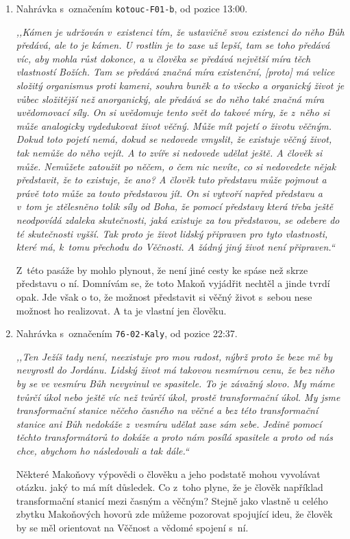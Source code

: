 \begin{enumerate}
{Že ve stavu nebe je člověk v~činnosti zdůrazňuje Makoň opakovaně. Zde mi jde o
výrok, že člověk se má stát spoluspasitelem a spolustvořitelem.

}

\item{
Nahrávka s~označením \texttt{kotouc-F01-b}, od pozice 13:00.

\textit{%
,,Kámen je udržován v~existenci tím, že ustavičně svou existenci do něho Bůh
předává, ale to je kámen. U rostlin je to zase už lepší, tam se toho předává
víc, aby
mohla růst dokonce, a u člověka se předává největší míra těch vlastností Božích.
Tam se předává značná míra existenční, [proto] má velice složitý organismus proti
kameni, souhra buněk a to všecko a organický život je vůbec složitější než
anorganický, ale předává
se do něho také značná míra uvědomovací síly. On si uvědomuje tento svět do
takové míry, že z~něho si může analogicky vydedukovat život věčný. Může mít pojetí
o životu věčným. Dokud toto pojetí nemá, dokud se nedovede vmyslit, že
existuje věčný život, tak nemůže do něho vejít. A to zvíře si nedovede udělat
ještě. A člověk si může. Nemůžete zatoužit po něčem, o čem nic nevíte, co si
nedovedete
nějak představit, že to existuje, že ano? A člověk tuto představu může pojmout a
právě toto může za touto představou jít. On si vytvoří napřed představu a v~tom je
ztělesněno tolik síly od Boha, že pomocí představy která třeba ještě neodpovídá
zdaleka skutečnosti, jaká existuje za tou představou, se odebere do té skutečnosti
vyšší. Tak proto je život lidský připraven pro tyto vlastnosti, které má, k~tomu
přechodu do Věčnosti. A žádný jiný život není připraven.``
}

Z~této pasáže by mohlo plynout, že není jiné cesty ke spáse než skrze představu
o ní. Domnívám se, že toto Makoň vyjádřit nechtěl a jinde tvrdí opak. Jde však o
to, že možnost představit si věčný život s~sebou nese možnost ho realizovat. A
ta je vlastní jen člověku.

}

\item{
Nahrávka s~označením \texttt{76-02-Kaly}, od pozice 22:37.

\textit{%
,,Ten Ježíš tady není, neexistuje pro mou radost, nýbrž proto že beze mě by
nevyrostl do Jordánu. Lidský život má takovou nesmírnou cenu, že bez něho by se ve
vesmíru Bůh nevyvinul ve spasitele. To je závažný slovo. My máme tvůrčí úkol nebo ještě víc
než tvůrčí úkol, prostě transformační úkol. My jsme transformační stanice něčeho
časného na věčné a bez této transformační stanice ani Bůh nedokáže z~vesmíru
udělat zase sám sebe. Jedině pomocí těchto transformátorů to dokáže a proto nám
posílá spasitele a proto od nás chce, abychom ho následovali a tak dále.``
}

}

Některé Makoňovy výpovědi o člověku a jeho podstatě mohou vyvolávat otázku. jaký
to má mít důsledek. Co z~toho plyne, že je člověk například transformační
stanicí mezi časným a věčným? Stejně jako vlastně u celého zbytku Makoňových
hovorů zde můžeme pozorovat spojující ideu, že člověk by se měl orientovat na
Věčnost a vědomé spojení s~ní.

\end{enumerate}

